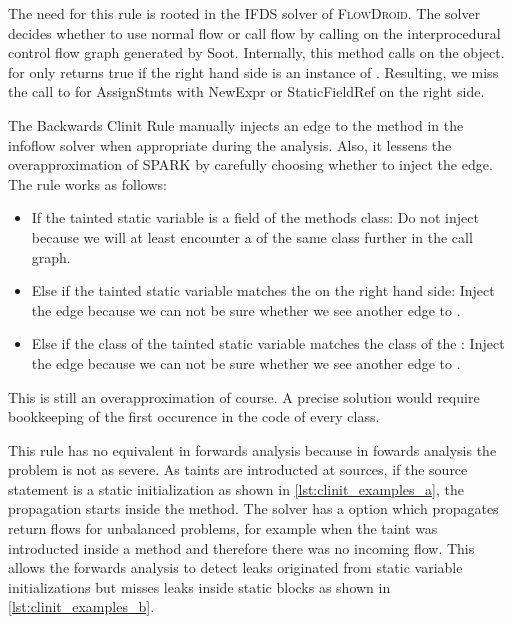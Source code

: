 \documentclass[../draft.tex]{subfiles}
\begin{document}
    The need for this rule is rooted in the IFDS solver of \textsc{FlowDroid}. The solver decides whether to use normal flow or call flow by calling  on the interprocedural control flow graph generated by Soot. Internally, this method calls  on the  object.  for  only returns true if the right hand side is an instance of . Resulting, we miss the call to  for AssignStmts with NewExpr or StaticFieldRef on the right side.

    The Backwards Clinit Rule manually injects an edge to the  method in the infoflow solver when appropriate during the analysis. Also, it lessens the overapproximation of SPARK by carefully choosing whether to inject the edge. The rule works as follows:
    \begin{itemize}
        \item If the tainted static variable is a field of the methods class: Do not inject because we will at least encounter a  of the same class further in the call graph.
        \item Else if the tainted static variable matches the  on the right hand side: Inject the edge because we can not be sure whether we see another edge to .
        \item Else if the class of the tainted static variable matches the class of the : Inject the edge because we can not be sure whether we see another edge to .
    \end{itemize}
    This is still an overapproximation of course. A precise solution would require bookkeeping of the first occurence in the code of every class. 

    This rule has no equivalent in forwards analysis because in fowards analysis the problem is not as severe. As taints are introducted at sources, if the source statement is a static initialization as shown in \autoref{lst:clinit_examples_a}, the propagation starts inside the  method. The solver has a  option which propagates return flows for unbalanced problems, for example when the taint was introducted inside a method and therefore there was no incoming flow. This allows the forwards analysis to detect leaks originated from static variable initializations but misses leaks inside static blocks as shown in \autoref{lst:clinit_examples_b}.
\end{document}
